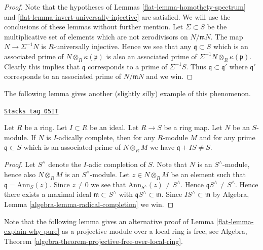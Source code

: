 \begin{proof}

Note that the hypotheses of
Lemmas \ref{flat-lemma-homothety-spectrum} and
\ref{flat-lemma-invert-universally-injective}
are satisfied. We will use the conclusions of these lemmas without further
mention. Let $\Sigma \subset S$ be the multiplicative set of elements
which are not zerodivisors on $N/\mathfrak mN$. The map
$N \to \Sigma^{-1}N$ is $R$-universally injective. Hence we see that
any $\mathfrak q \subset S$ which is an associated prime of
$N \otimes_R \kappa(\mathfrak p)$ is also an associated prime of
$\Sigma^{-1}N \otimes_R \kappa(\mathfrak p)$. Clearly this implies that
$\mathfrak q$ corresponds to a prime of $\Sigma^{-1}S$.
Thus $\mathfrak q \subset \mathfrak q'$ where $\mathfrak q'$
corresponds to an associated prime of $N/\mathfrak mN$ and we win.
\end{proof}

The following lemma gives another (slightly silly) example of this phenomenon.

\begin{lemma}
\label{flat-lemma-explain-why-pure-complete}
\href{https://stacks.math.columbia.edu/tag/05IT}{\texttt{Stacks tag 05IT}}

Let $R$ be a ring. Let $I \subset R$ be an ideal.
Let $R \to S$ be a ring map. Let $N$ be an $S$-module.
If $N$ is $I$-adically complete, then for any $R$-module $M$ and
for any prime $\mathfrak q \subset S$ which is an associated prime of
$N \otimes_R M$ we have $\mathfrak q + I S \not = S$.
\end{lemma}

\begin{proof}
Let $S^\wedge$ denote the $I$-adic completion of $S$.
Note that $N$ is an $S^\wedge$-module, hence also
$N \otimes_R M$ is an $S^\wedge$-module.
Let $z \in N \otimes_R M$ be an element such that
$\mathfrak q = \text{Ann}_S(z)$. Since $z \not = 0$ we see
that $\text{Ann}_{S^\wedge}(z) \not = S^\wedge$. Hence
$\mathfrak q S^\wedge \not = S^\wedge$. Hence there exists a
maximal ideal $\mathfrak m \subset S^\wedge$ with
$\mathfrak q S^\wedge \subset \mathfrak m$. Since
$IS^\wedge \subset \mathfrak m$ by
Algebra, Lemma \ref{algebra-lemma-radical-completion}
we win.
\end{proof}

Note that the following lemma gives an alternative proof of
Lemma \ref{flat-lemma-explain-why-pure}
as a projective module over a local ring is free, see
Algebra, Theorem \ref{algebra-theorem-projective-free-over-local-ring}.

